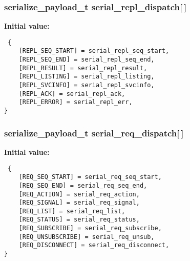 \subsubsection{\setlength{\rightskip}{0pt plus 5cm}\bf{serialize\_\-payload\_\-t} \bf{serial\_\-repl\_\-dispatch}[$\,$]\hspace{0.3cm}{\tt  [static]}}\label{upk__v0__protocol__serializer_8c_2e39c2f2d3890ea1b784eb20d4d5b0e2}


\textbf{Initial value:}

\begin{Code}\begin{verbatim} {
    [REPL_SEQ_START] = serial_repl_seq_start,
    [REPL_SEQ_END] = serial_repl_seq_end,
    [REPL_RESULT] = serial_repl_result,
    [REPL_LISTING] = serial_repl_listing,
    [REPL_SVCINFO] = serial_repl_svcinfo,
    [REPL_ACK] = serial_repl_ack,
    [REPL_ERROR] = serial_repl_err,
}
\end{verbatim}\end{Code}
\subsubsection{\setlength{\rightskip}{0pt plus 5cm}\bf{serialize\_\-payload\_\-t} \bf{serial\_\-req\_\-dispatch}[$\,$]\hspace{0.3cm}{\tt  [static]}}\label{upk__v0__protocol__serializer_8c_da0ec6015acbedfcde2f4c48a75afc42}


\textbf{Initial value:}

\begin{Code}\begin{verbatim} {
    [REQ_SEQ_START] = serial_req_seq_start,
    [REQ_SEQ_END] = serial_req_seq_end,
    [REQ_ACTION] = serial_req_action,
    [REQ_SIGNAL] = serial_req_signal,
    [REQ_LIST] = serial_req_list,
    [REQ_STATUS] = serial_req_status,
    [REQ_SUBSCRIBE] = serial_req_subscribe,
    [REQ_UNSUBSCRIBE] = serial_req_unsub,
    [REQ_DISCONNECT] = serial_req_disconnect,
}
\end{verbatim}\end{Code}
